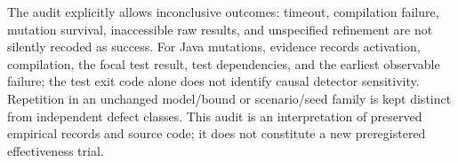 The audit explicitly allows inconclusive outcomes: timeout, compilation
failure, mutation survival, inaccessible raw results, and unspecified
refinement are not silently recoded as success. For Java mutations, evidence
records activation, compilation, the focal test result, test dependencies,
and the earliest observable failure; the test exit code alone does not
identify causal detector sensitivity. Repetition in an unchanged
model/bound or scenario/seed family is kept distinct from independent defect
classes. This audit is an interpretation of preserved empirical records and
source code; it does not constitute a new preregistered effectiveness trial.
